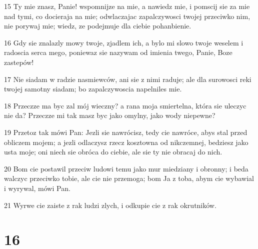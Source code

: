 \par 15 Ty mie znasz, Panie! wspomnijze na mie, a nawiedz mie, i pomscij sie za mie nad tymi, co docieraja na mie; odwlaczajac zapalczywosci twojej przeciwko nim, nie porywaj mie; wiedz, ze podejmuje dla ciebie pohanbienie.
\par 16 Gdy sie znalazly mowy twoje, zjadlem ich, a bylo mi slowo twoje weselem i radoscia serca mego, poniewaz sie nazywam od imienia twego, Panie, Boze zastepów!
\par 17 Nie siadam w radzie nasmiewców, ani sie z nimi raduje; ale dla surowosci reki twojej samotny siadam; bo zapalczywoscia napelniles mie.
\par 18 Przeczze ma byc zal mój wieczny? a rana moja smiertelna, która sie uleczyc nie da? Przeczze mi tak masz byc jako omylny, jako wody niepewne?
\par 19 Przetoz tak mówi Pan: Jezli sie nawrócisz, tedy cie nawróce, abys stal przed obliczem mojem; a jezli odlaczysz rzecz kosztowna od nikczemnej, bedziesz jako usta moje; oni niech sie obróca do ciebie, ale sie ty nie obracaj do nich.
\par 20 Bom cie postawil przeciw ludowi temu jako mur miedziany i obronny; i beda walczyc przeciwko tobie, ale cie nie przemoga; bom Ja z toba, abym cie wybawial i wyrywal, mówi Pan.
\par 21 Wyrwe cie zaiste z rak ludzi zlych, i odkupie cie z rak okrutników.

\chapter{16}

